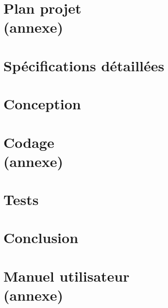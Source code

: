 \documentclass[12pt,a4paper,titlepage,oneside]{report}
\begin{document}
    \renewcommand{\contentsname}{Sommaire}
    \tableofcontents


    \normalsize
    \part{Plan projet\\(annexe)}
    \part{ Spécifications détaillées}
    
    \part{ Conception}
    \setcounter{chapter}{0}
    
    \part{Codage\\(annexe)}
    \part{Tests}
    

    \part{Conclusion}
    


    \appendix
    \part{Manuel utilisateur\\(annexe)}
\end{document}
